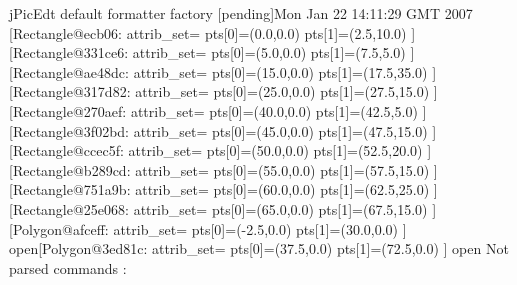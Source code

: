 jPicEdt default formatter factory [pending]Mon Jan 22 14:11:29 GMT 2007
[Rectangle@ecb06:
	attrib_set={}
	pts[0]=(0.0,0.0) pts[1]=(2.5,10.0) 
][Rectangle@331ce6:
	attrib_set={}
	pts[0]=(5.0,0.0) pts[1]=(7.5,5.0) 
][Rectangle@ae48dc:
	attrib_set={}
	pts[0]=(15.0,0.0) pts[1]=(17.5,35.0) 
][Rectangle@317d82:
	attrib_set={}
	pts[0]=(25.0,0.0) pts[1]=(27.5,15.0) 
][Rectangle@270aef:
	attrib_set={}
	pts[0]=(40.0,0.0) pts[1]=(42.5,5.0) 
][Rectangle@3f02bd:
	attrib_set={}
	pts[0]=(45.0,0.0) pts[1]=(47.5,15.0) 
][Rectangle@ccec5f:
	attrib_set={}
	pts[0]=(50.0,0.0) pts[1]=(52.5,20.0) 
][Rectangle@b289cd:
	attrib_set={}
	pts[0]=(55.0,0.0) pts[1]=(57.5,15.0) 
][Rectangle@751a9b:
	attrib_set={}
	pts[0]=(60.0,0.0) pts[1]=(62.5,25.0) 
][Rectangle@25e068:
	attrib_set={}
	pts[0]=(65.0,0.0) pts[1]=(67.5,15.0) 
][Polygon@afceff:
	attrib_set={}
	pts[0]=(-2.5,0.0) pts[1]=(30.0,0.0) 
] open[Polygon@3ed81c:
	attrib_set={}
	pts[0]=(37.5,0.0) pts[1]=(72.5,0.0) 
] open
Not parsed commands :


